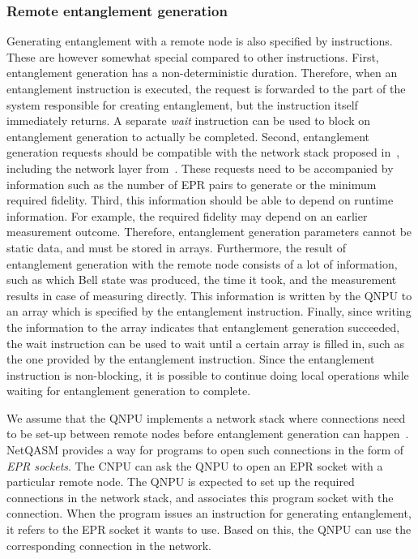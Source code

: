 \subsubsection{Remote entanglement generation}
Generating entanglement with a remote node is also specified by instructions.
These are however somewhat special compared to other instructions.
First, entanglement generation has a non-deterministic duration.
Therefore, when an entanglement instruction is executed, the request is forwarded to the part of the system responsible for creating entanglement, but the instruction itself immediately returns.
A separate \textit{wait} instruction can be used to block on entanglement generation to actually be completed.
Second, entanglement generation requests should be compatible with the network stack proposed in~\cite{dahlberg2019linklayer}, including the network layer from~\cite{kozlowski2020networklayer}.
These requests need to be accompanied by information such as the number of EPR pairs to generate or the minimum required fidelity.
Third, this information should be able to depend on runtime information.
For example, the required fidelity may depend on an earlier measurement outcome.
Therefore, entanglement generation parameters cannot be static data, and must be stored in arrays.
Furthermore, the result of entanglement generation with the remote node consists of a lot of information, such as which Bell state was produced, the time it took, and the measurement results in case of measuring directly.
This information is written by the \ac{QNPU} to an array which is specified by the entanglement instruction.
Finally, since writing the information to the array indicates that entanglement generation succeeded, the wait instruction can be used to wait until a certain array is filled in, such as the one provided by the entanglement instruction.
Since the entanglement instruction is non-blocking, it is possible to continue doing local operations while waiting for entanglement generation to complete.

We assume that the \ac{QNPU} implements a network stack where connections need to be set-up between remote nodes before entanglement generation can happen~\cite{kozlowski2020networklayer, dahlberg2019linklayer}.
\ac{NetQASM} provides a way for programs to open such connections in the form of \textit{EPR sockets}.
The \ac{CNPU} can ask the \ac{QNPU} to open an EPR socket with a particular remote node.
The \ac{QNPU} is expected to set up the required connections in the network stack, and associates this program socket with the connection.
When the program issues an instruction for generating entanglement, it refers to the EPR socket it wants to use.
Based on this, the \ac{QNPU} can use the corresponding connection in the network.


